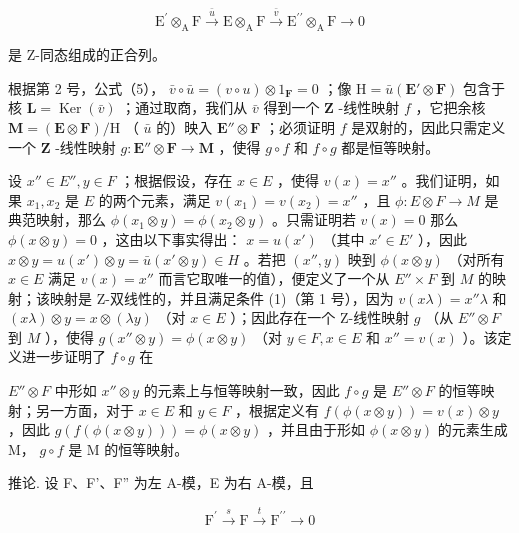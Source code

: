 \[
\mathrm{E} ^ {\prime} \otimes_ {\mathrm{A}} \mathrm{F} \xrightarrow {\bar {u}} \mathrm{E} \otimes_ {\mathrm{A}} \mathrm{F} \xrightarrow {\bar {v}} \mathrm{E} ^ {\prime \prime} \otimes_ {\mathrm{A}} \mathrm{F} \longrightarrow 0\tag{15}
\]

是 Z-同态组成的正合列。

根据第 2 号，公式（5）， \(\bar{v} \circ \bar{u} = (v \circ u) \otimes 1_{\mathbf{F}} = 0\) ；像 \(\mathrm{H} = \bar{u} (\mathbf{E}' \otimes \mathbf{F})\) 包含于核 \(\mathbf{L} = \operatorname{Ker}(\bar{v})\) ；通过取商，我们从 \(\bar{v}\) 得到一个 \(\mathbf{Z}\) -线性映射 \(f\) ，它把余核 \(\mathbf{M} = (\mathbf{E} \otimes \mathbf{F}) / \mathrm{H}\) （ \(\bar{u}\) 的）映入 \(\mathbf{E}'' \otimes \mathbf{F}\) ；必须证明 \(f\) 是双射的，因此只需定义一个 \(\mathbf{Z}\) -线性映射 \(g: \mathbf{E}'' \otimes \mathbf{F} \to \mathbf{M}\) ，使得 \(g \circ f\) 和 \(f \circ g\) 都是恒等映射。

设 \(x'' \in E'', y \in F\) ；根据假设，存在 \(x \in E\) ，使得 \(v(x) = x''\) 。我们证明，如果 \(x_1, x_2\) 是 \(E\) 的两个元素，满足 \(v(x_1) = v(x_2) = x''\) ，且 \(\phi: E \otimes F \to M\) 是典范映射，那么 \(\phi(x_1 \otimes y) = \phi(x_2 \otimes y)\) 。只需证明若 \(v(x) = 0\) 那么 \(\phi(x \otimes y) = 0\) ，这由以下事实得出： \(x = u(x')\) （其中 \(x' \in E'\) ），因此 \(x \otimes y = u(x') \otimes y = \bar{u}(x' \otimes y) \in H\) 。若把 \((x'', y)\) 映到 \(\phi(x \otimes y)\) （对所有 \(x \in E\) 满足 \(v(x) = x''\) 而言它取唯一的值），便定义了一个从 \(E'' \times F\) 到 \(M\) 的映射；该映射是 Z-双线性的，并且满足条件 (1)（第 1 号），因为 \(v(x\lambda) = x''\lambda\) 和 \((x\lambda) \otimes y = x \otimes (\lambda y)\) （对 \(x \in E\) ）；因此存在一个 Z-线性映射 \(g\) （从 \(E'' \otimes F\) 到 \(M\) ），使得 \(g(x'' \otimes y) = \phi(x \otimes y)\) （对 \(y \in F, x \in E\) 和 \(x'' = v(x)\) ）。该定义进一步证明了 \(f \circ g\) 在

\(E'' \otimes F\) 中形如 \(x'' \otimes y\) 的元素上与恒等映射一致，因此 \(f \circ g\) 是 \(E'' \otimes F\) 的恒等映射；另一方面，对于 \(x \in E\) 和 \(y \in F\) ，根据定义有 \(f(\phi(x \otimes y)) = v(x) \otimes y\) ，因此 \(g(f(\phi(x \otimes y))) = \phi(x \otimes y)\) ，并且由于形如 \(\phi(x \otimes y)\) 的元素生成 M， \(g \circ f\) 是 M 的恒等映射。

推论. 设 F、F'、F'' 为左 A-模，E 为右 A-模，且

\[
\mathrm{F} ^ {\prime} \stackrel {s} {\longrightarrow} \mathrm{F} \stackrel {t} {\longrightarrow} \mathrm{F} ^ {\prime \prime} \longrightarrow 0\tag{16}
\]

